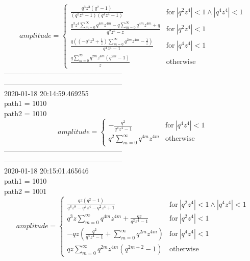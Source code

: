 \documentclass{jsreport}
\begin{document}
$$amplitude = \begin{cases} \frac{q^{3} z^{3} \left(q^{2} - 1\right)}{\left(q^{2} z^{4} - 1\right) \left(q^{4} z^{4} - 1\right)} & \text{for}\: \left|{q^{2} z^{4}}\right| < 1 \wedge \left|{q^{4} z^{4}}\right| < 1 \\\frac{q^{3} z^{4} \sum_{m=0}^{\infty} q^{4 m} z^{4 m} - q \sum_{m=0}^{\infty} q^{4 m} z^{4 m} + q}{q^{2} z^{5} - z} & \text{for}\: \left|{q^{2} z^{4}}\right| < 1 \\\frac{q \left(\left(- q^{4} z^{3} + \frac{1}{z}\right) \sum_{m=0}^{\infty} q^{2 m} z^{4 m} - \frac{1}{z}\right)}{q^{4} z^{4} - 1} & \text{for}\: \left|{q^{4} z^{4}}\right| < 1 \\\frac{q \sum_{m=0}^{\infty} q^{2 m} z^{4 m} \left(q^{2 m} - 1\right)}{z} & \text{otherwise} \end{cases}$$
--------------------------------------------------\\
--------------------------------------------------\\
2020-01-18 20:14:59.469255\\
path1 = 1010\\
path2 = 1010\\
$$amplitude = \begin{cases} - \frac{q^{2}}{q^{4} z^{4} - 1} & \text{for}\: \left|{q^{4} z^{4}}\right| < 1 \\q^{2} \sum_{m=0}^{\infty} q^{4 m} z^{4 m} & \text{otherwise} \end{cases}$$
--------------------------------------------------\\
--------------------------------------------------\\
2020-01-18 20:15:01.465646\\
path1 = 1010\\
path2 = 1001\\
$$amplitude = \begin{cases} \frac{q z \left(q^{2} - 1\right)}{q^{6} z^{8} - q^{4} z^{4} - q^{2} z^{4} + 1} & \text{for}\: \left|{q^{2} z^{4}}\right| < 1 \wedge \left|{q^{4} z^{4}}\right| < 1 \\q^{3} z \sum_{m=0}^{\infty} q^{4 m} z^{4 m} + \frac{q z}{q^{2} z^{4} - 1} & \text{for}\: \left|{q^{2} z^{4}}\right| < 1 \\- q z \left(\frac{q^{2}}{q^{4} z^{4} - 1} + \sum_{m=0}^{\infty} q^{2 m} z^{4 m}\right) & \text{for}\: \left|{q^{4} z^{4}}\right| < 1 \\q z \sum_{m=0}^{\infty} q^{2 m} z^{4 m} \left(q^{2 m + 2} - 1\right) & \text{otherwise} \end{cases}$$
\end{document}
